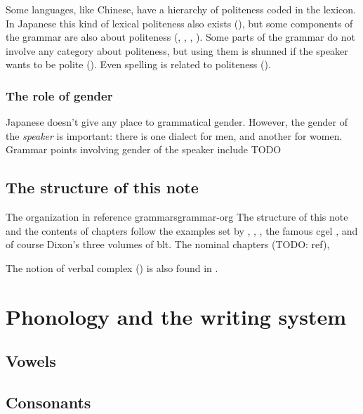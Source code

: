 \documentclass[UTF8, a4paper, oneside, scheme=plain]{ctexrep}
\begin{document}
Some languages, like Chinese, have a hierarchy of politeness coded in the lexicon.
In Japanese this kind of lexical politeness also exists (),
but some components of the grammar are also about politeness
(, , 
, ).
Some parts of the grammar do not involve any category about politeness,
but using them is shunned if the speaker wants to be polite
().
Even spelling is related to politeness ().

\subsection{The role of gender}

Japanese doesn't give any place to grammatical gender.
However, the gender of the \emph{speaker} is important:
there is one dialect for men,
and another for women.
Grammar points involving gender of the speaker include TODO

\section{The structure of this note}

\begin{theorybox}{The organization in reference grammars}{grammar-org}
    The structure of this note and the contents of chapters follow 
    the examples set by \citet{Friesen2017}, \citet{jacques2021grammar}, \citet{Grimm2021},
    the famous \acs{cgel} \citep{cgel}, and of course Dixon's three volumes of \acs{blt}.
    The nominal chapters (TODO: ref), 
    
    The notion of verbal complex () is also found in 
    \citet{Friesen2017}.
\end{theorybox}

\chapter{Phonology and the writing system}

\section{Vowels}\label{sec:vowel}

\section{Consonants}\label{sec:consonant}
\end{document}

